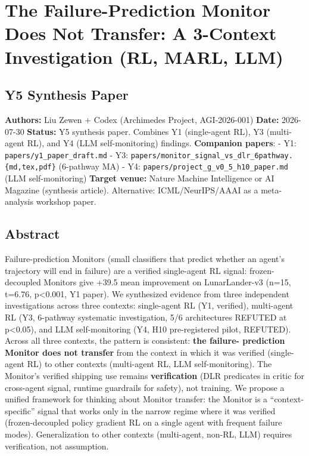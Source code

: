\documentclass[
]{article}
\author{}
\date{}
\begin{document}
\section{The Failure-Prediction Monitor Does Not Transfer: A 3-Context
Investigation (RL, MARL,
LLM)}\label{the-failure-prediction-monitor-does-not-transfer-a-3-context-investigation-rl-marl-llm}

\subsection{Y5 Synthesis Paper}\label{y5-synthesis-paper}

\textbf{Authors:} Liu Zewen + Codex (Archimedes Project, AGI-2026-001)
\textbf{Date:} 2026-07-30 \textbf{Status:} Y5 synthesis paper. Combines
Y1 (single-agent RL), Y3 (multi-agent RL), and Y4 (LLM self-monitoring)
findings. \textbf{Companion papers}: - Y1:
\texttt{papers/y1\_paper\_draft.md} - Y3:
\texttt{papers/monitor\_signal\_vs\_dlr\_6pathway.\{md,tex,pdf\}}
(6-pathway MA) - Y4: \texttt{papers/project\_g\_v0\_5\_h10\_paper.md}
(LLM self-monitoring) \textbf{Target venue:} Nature Machine Intelligence
or AI Magazine (synthesis article). Alternative: ICML/NeurIPS/AAAI as a
meta-analysis workshop paper.

\subsection{Abstract}\label{abstract}

Failure-prediction Monitors (small classifiers that predict whether an
agent's trajectory will end in failure) are a verified single-agent RL
signal: frozen-decoupled Monitors give +39.5 mean improvement on
LunarLander-v3 (n=15, t=6.76, p\textless0.001, Y1 paper). We synthesized
evidence from three independent investigations across three contexts:
single-agent RL (Y1, verified), multi-agent RL (Y3, 6-pathway systematic
investigation, 5/6 architectures REFUTED at p\textless0.05), and LLM
self-monitoring (Y4, H10 pre-registered pilot, REFUTED). Across all
three contexts, the pattern is consistent: \textbf{the failure-
prediction Monitor does not transfer} from the context in which it was
verified (single-agent RL) to other contexts (multi-agent RL, LLM
self-monitoring). The Monitor's verified shipping use remains
\textbf{verification} (DLR predicates in critic for cross-agent signal,
runtime guardrails for safety), not training. We propose a unified
framework for thinking about Monitor transfer: the Monitor is a
``context-specific'' signal that works only in the narrow regime where
it was verified (frozen-decoupled policy gradient RL on a single agent
with frequent failure modes). Generalization to other contexts
(multi-agent, non-RL, LLM) requires verification, not assumption.
\end{document}
